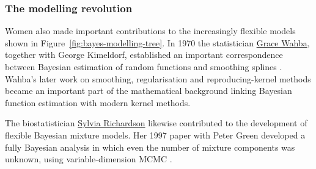 \subsubsection{The modelling revolution}

Women also made important contributions to the increasingly flexible models shown in Figure~\ref{fig:bayes-modelling-tree}. In 1970 the statistician \href{https://en.wikipedia.org/wiki/Grace_Wahba}{Grace Wahba}, together with George Kimeldorf, established an important correspondence between Bayesian estimation of random functions and smoothing splines \cite{kimeldorfwahba1970}. Wahba's later work on smoothing, regularisation and reproducing-kernel methods became an important part of the mathematical background linking Bayesian function estimation with modern kernel methods. 

The biostatistician \href{https://en.wikipedia.org/wiki/Sylvia_Richardson}{Sylvia Richardson} likewise contributed to the development of flexible Bayesian mixture models. Her 1997 paper with Peter Green developed a fully Bayesian analysis in which even the number of mixture components was unknown, using variable-dimension MCMC \cite{richardsongreen1997}. 


